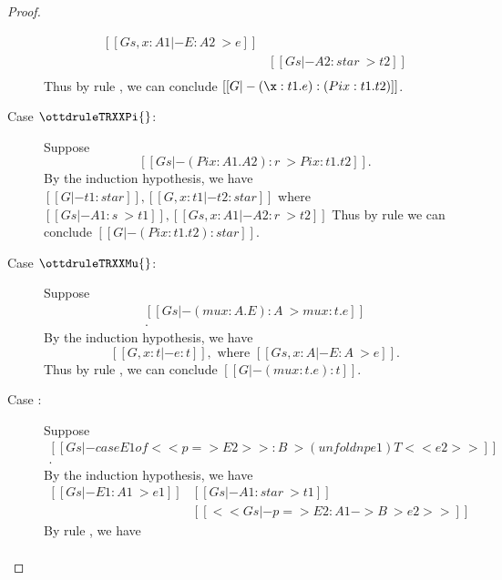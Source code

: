 \begin{proof}
\begin{description}
\[\begin{array}{ll}
            [[Gs, x : A1 |- E : A2 ~> e]] & \\
            [[Gs |- A1 : star ~> t1]] & [[Gs |- A2 : star ~> t2]] \\
            [[Gs |- (Pi x:A1.A2) : s ~> Pi x:t1.t2]] &
            \end{array}
            \]
            Thus by rule , we can conclude $[[G |- (\x:t1.e):(Pi x:t1.t2)]]$.
        \item[Case $\ottdruleTRXXPi{}$:] $\quad$ \\ Suppose 
                \[ [[Gs |- (Pi x:A1.A2):r ~> Pi x:t1.t2]]. \] 
            By the induction hypothesis, we have 
            $
                [[G |- t1 : star]], [[G, x : t1 |- t2 : star]]
            $
            where
            $
                [[Gs |- A1 : s ~> t1]], [[Gs, x: A1 |- A2 : r ~> t2]]
            $
            Thus by rule  we can conclude $[[G |- (Pi x:t1.t2) : star]]$.
        \item[Case $\ottdruleTRXXMu{}$:] $\quad$ \\ Suppose 
                \[\begin{array}{l}
                    [[Gs |- (mu x:A . E):A ~> mu x:t.e]] \\
                    [[Gs |- A : star ~> t]]. 
                \end{array}\]
            By the induction hypothesis, we have 
                \[ [[G, x : t |- e : t]],\text{ where }[[Gs, x:A |- E:A ~> e]]. \] 
            Thus by rule , we can conclude $[[G |- (mu x:t.e) : t]]$.
        \item[Case \resizebox{.9\columnwidth}{!}{$\ottdruleTRXXCaseT{}$}:] $\quad$ \\ Suppose 
            \[\begin{array}{l}
                [[Gs |- case E1 of << p => E2>> : B ~> (unfoldnp e1) T <<e2>>]] \\
                [[Gs |- B : star ~> T]].
            \end{array}\]
            By the induction hypothesis, we have 
            \[\begin{array}{ll}
                [[Gs |- E1 : A1 ~> e1]] &
                [[Gs |- A1 : star ~> t1]] \\
                [[G |- e1 : t1]] &
                [[<< Gs |- p => E2 : A1 -> B ~> e2 >>]]            
            \end{array}\]
            By rule , we have
            \begin{align*}

\end{align*}
\end{description}
\end{proof}

